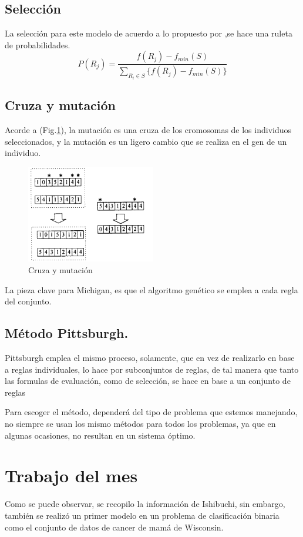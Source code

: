 \documentclass{article}
\begin{document}
\subsection*{Selección}
La selección para este modelo de acuerdo a lo propuesto por \citep{article1},se hace una ruleta de probabilidades.
\begin{equation*}
    P(R_j)=\frac{f(R_j)-f_{min}(S)}{\sum_{R_i\in S}\{f(R_j)-f_{min}(S)\}}
\end{equation*}
\subsection*{Cruza y mutación}
Acorde a (Fig.\ref{fig:fig1}), la mutación es una cruza de los cromosomas de los individuos seleccionados, y la mutación es un ligero cambio que se realiza en el gen de un individuo.
\begin{figure}[h]
    \includegraphics[width=0.5\textwidth]{image1.png}
    \caption{Cruza y mutación}
    \label{fig:fig1}
\end{figure}
La pieza clave para Michigan, es que el algoritmo genético se emplea a cada regla del conjunto.
\subsection{Método Pittsburgh.}
Pittsburgh emplea el mismo proceso, solamente, que en vez de realizarlo en base a reglas individuales, lo hace por subconjuntos de reglas, de tal manera que tanto las formulas de evaluación, como de selección, se hace en base a un conjunto de reglas

Para escoger el método, dependerá del tipo de problema que estemos manejando, no siempre se usan los mismo métodos para todos los problemas, ya que en algunas ocasiones, no resultan en un sistema óptimo.

\section{Trabajo del mes}
Como se puede observar, se recopilo la información de Ishibuchi, sin embargo, también se realizó un primer modelo en un problema de clasificación binaria como el conjunto de datos de cancer de mamá de Wisconsin.
\end{document}
